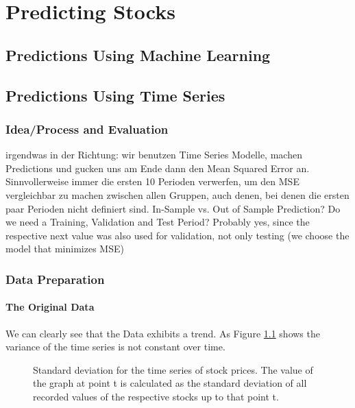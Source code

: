 \chapter{Predicting Stocks}\label{ch:predictions}


\section{Predictions Using Machine Learning}

\section{Predictions Using Time Series}
\subsection{Idea/Process and Evaluation}
irgendwas in der Richtung: wir benutzen Time Series Modelle, machen Predictions und gucken uns am Ende dann den Mean Squared Error an. Sinnvollerweise immer die ersten 10 Perioden verwerfen, um den MSE vergleichbar zu machen zwischen allen Gruppen, auch denen, bei denen die ersten paar Perioden nicht definiert sind. 	
In-Sample vs. Out of Sample Prediction?
Do we need a Training, Validation and Test Period? Probably yes, since the respective next value was also used for validation, not only testing (we choose the model that minimizes MSE)

\subsection{Data Preparation}
\subsubsection*{The Original Data}

We can clearly see that the Data exhibits a trend. As Figure \ref{fig:cum_sd_all} shows the variance of the time series is not constant over time. 

\begin{figure}[H]
    \centering
    \begin{adjustbox}{width=.9\textwidth,center}
    
    \end{adjustbox}  
    \caption{Standard deviation for the time series of stock prices. The value of the graph at point t is calculated as the standard deviation of all recorded values of the respective stocks up to that point t.}
    \label{fig:cum_sd_all}
\end{figure}{}

